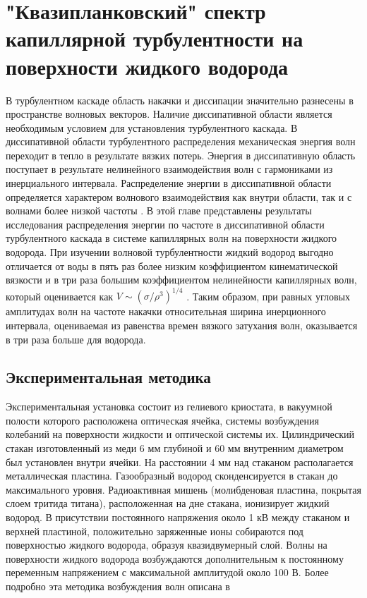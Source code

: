 \chapter{"Квазипланковский" спектр капиллярной турбулентности на поверхности жидкого водорода}


В турбулентном каскаде область накачки и диссипации значительно разнесены в пространстве волновых векторов. Наличие диссипативной области является необходимым условием для установления турбулентного каскада. В диссипативной области турбулентного распределения механическая энергия волн переходит в тепло в результате вязких потерь. Энергия в диссипативную область поступает в результате нелинейного взаимодействия волн с гармониками из инерциального интервала. Распределение энергии в диссипативной области определяется характером волнового взаимодействия как внутри области, так и с волнами более низкой частоты \cite{Ryzhenkova1990}. 
В этой главе представлены результаты исследования распределения энергии по частоте в диссипативной области турбулентного каскада в системе капиллярных волн на поверхности жидкого водорода. При изучении волновой турбулентности жидкий водород выгодно отличается от воды в пять раз более низким коэффициентом кинематической вязкости и в три раза большим коэффициентом нелинейности капиллярных волн, который оценивается как $V \sim (\sigma / \rho^3)^{1/4}$ . Таким образом, при равных угловых амплитудах волн на частоте накачки относительная ширина инерционного интервала, оцениваемая из равенства времен вязкого затухания волн, оказывается в три раза больше для водорода. 

\section{Экспериментальная методика} %
 Экспериментальная установка состоит из гелиевого криостата, в вакуумной полости которого расположена оптическая ячейка, системы возбуждения колебаний на поверхности жидкости и оптической системы их. Цилиндрический стакан изготовленный из меди 6 мм глубиной и 60 мм внутренним диаметром был установлен внутри ячейки. На расстоянии 4 мм над стаканом располагается металлическая пластина. Газообразный водород сконденсируется в стакан до максимального уровня. Радиоактивная мишень (молибденовая пластина, покрытая слоем тритида титана), расположенная на дне стакана, ионизирует жидкий водород. В присутствии постоянного напряжения около 1 кВ между стаканом и верхней пластиной, положительно заряженные ионы собираются под поверхностью жидкого водорода, образуя квазидвумерный слой. Волны на поверхности жидкого водорода возбуждаются дополнительным к постоянному переменным напряжением с максимальной амплитудой около 100 В. Более подробно эта методика возбуждения волн описана в \cite{Brazhnikov_IET}

